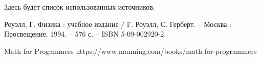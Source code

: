 \begingroup
\renewcommand{\section}[2]{\Anonchapter{Список использованных источников}}
\begin{thebibliography}{00}

    Здесь будет список использованных источников.

    Роуэлл, Г. Физика : учебное издание / Г. Роуэлл, С. Герберт. -- Москва : Просвещение, 1994. -- 576 с. -- ISBN 5-09-002920-2.

    Math for Progammers \TODO
    https://www.manning.com/books/math-for-programmers

\end{thebibliography}
\endgroup

\clearpage
